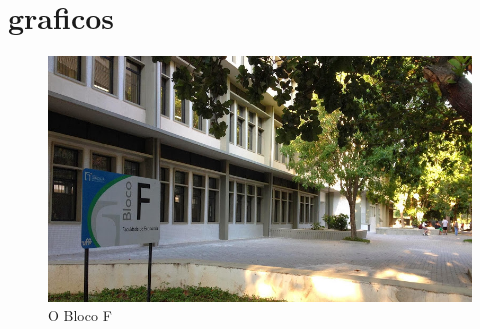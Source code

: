 

\chapter{graficos}
\label{cap:graf}

\lipsum[37]


\begin{figure}[h]
	\includegraphics[width=\textwidth]{imagens/blocof.jpg}
	\caption{O Bloco F}
	\label{fig:blocof} %
\end{figure}


\lipsum[35-36]